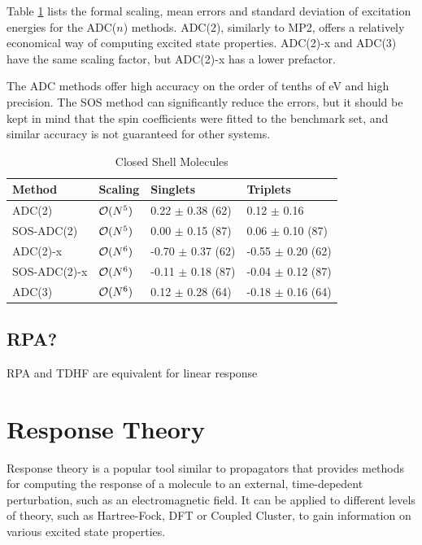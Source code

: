 Table \ref{tab:ADCSTATS} lists the formal scaling, mean errors and standard deviation of excitation energies for the ADC($n$) methods. ADC(2), similarly to MP2, offers a relatively economical way of computing excited state properties. ADC(2)-x and ADC(3) have the same scaling factor, but ADC(2)-x has a lower prefactor.  

The ADC methods offer high accuracy on the order of tenths of eV and high precision. The SOS method can significantly reduce the errors, but it should be kept in mind that the spin coefficients were fitted to the benchmark set, and similar accuracy is not guaranteed for other systems.

\begin{table}
\centering
\begin{tabular}{llll}
\hline
Method & Scaling & Singlets & Triplets \\ \hline
ADC(2) & $\mathcal{O}(N^{5})$ & 0.22 $\pm$ 0.38 (62) & 0.12 $\pm$ 0.16 \\
SOS-ADC(2) & $\mathcal{O}(N^{5})$ & 0.00 $\pm$ 0.15 (87) & 0.06 $\pm$ 0.10 (87) \\
ADC(2)-x & $\mathcal{O}(N^{6})$ & -0.70 $\pm$ 0.37 (62) & -0.55 $\pm$ 0.20 (62) \\
SOS-ADC(2)-x & $\mathcal{O}(N^{6})$ & -0.11 $\pm$ 0.18 (87) & -0.04 $\pm$ 0.12 (87) \\
ADC(3) & $\mathcal{O}(N^{6})$ & 0.12 $\pm$ 0.28 (64) & -0.18 $\pm$ 0.16 (64) \\ \hline  
\end{tabular}
\caption{Closed Shell Molecules}
\label{tab:ADCSTATS}
\end{table}

\subsection{RPA? }

RPA and TDHF are equivalent for linear response

\section{Response Theory}

Response theory is a popular tool similar to propagators that provides methods for computing the response of a molecule to an external, time-depedent perturbation, such as an electromagnetic field. It can be applied to different levels of theory, such as Hartree-Fock, DFT or Coupled Cluster, to gain information on various excited state properties.


